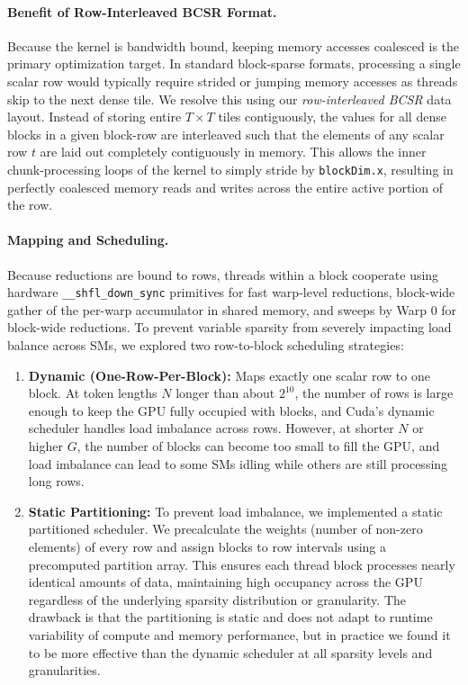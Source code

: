 \documentclass[11pt]{article}
\begin{document}
\paragraph{Benefit of Row-Interleaved BCSR Format.}
Because the kernel is bandwidth bound, keeping memory accesses coalesced is the primary optimization target. In standard block-sparse formats, processing a single scalar row would typically require strided or jumping memory accesses as threads skip to the next dense tile. We resolve this using our \textit{row-interleaved BCSR} data layout. Instead of storing entire $T \times T$ tiles contiguously, the values for all dense blocks in a given block-row are interleaved such that the elements of any scalar row $t$ are laid out completely contiguously in memory. This allows the inner chunk-processing loops of the kernel to simply stride by \texttt{blockDim.x}, resulting in perfectly coalesced memory reads and writes across the entire active portion of the row.

\paragraph{Mapping and Scheduling.}
Because reductions are bound to rows, threads within a block cooperate using hardware \texttt{\_\_shfl\_down\_sync} primitives for fast warp-level reductions, block-wide gather of the per-warp accumulator in shared memory, and sweeps by Warp 0 for block-wide reductions. To prevent variable sparsity from severely impacting load balance across SMs, we explored two row-to-block scheduling strategies:
\begin{enumerate}
    \item \textbf{Dynamic (One-Row-Per-Block):} Maps exactly one scalar row to one block. At token lengths $N$ longer than about $2^{10}$, the number of rows is large enough to keep the GPU fully occupied with blocks, and Cuda's dynamic scheduler handles load imbalance across rows. However, at shorter $N$ or higher $G$, the number of blocks can become too small to fill the GPU, and load imbalance can lead to some SMs idling while others are still processing long rows.
    \item \textbf{Static Partitioning:} To prevent load imbalance, we implemented a static partitioned scheduler. We precalculate the weights (number of non-zero elements) of every row and assign blocks to row intervals using a precomputed partition array. This ensures each thread block processes nearly identical amounts of data, maintaining high occupancy across the GPU regardless of the underlying sparsity distribution or granularity. The drawback is that the partitioning is static and does not adapt to runtime variability of compute and memory performance, but in practice we found it to be more effective than the dynamic scheduler at all sparsity levels and granularities.
\end{enumerate}
\end{document}
